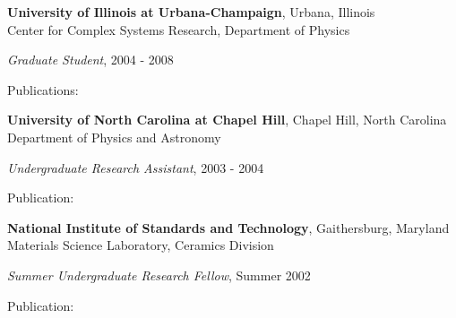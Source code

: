 {\bf University of Illinois at Urbana-Champaign}, Urbana, Illinois\\
Center for Complex Systems Research, Department of Physics
\begin{list1}
\item[] {\em Graduate Student}, 2004 - 2008
\item[] Publications: 
\end{list1}

{\bf University of North Carolina at Chapel Hill}, Chapel Hill, North Carolina\\
Department of Physics and Astronomy
\begin{list1}
\item[] {\em Undergraduate Research Assistant}, 2003 - 2004
\item[] Publication: 
\end{list1}

{\bf National Institute of Standards and Technology}, Gaithersburg, Maryland\\
Materials Science Laboratory, Ceramics Division
\begin{list1}
\item[] {\em Summer Undergraduate Research Fellow}, Summer 2002
\item[] Publication: 
\end{list1}

